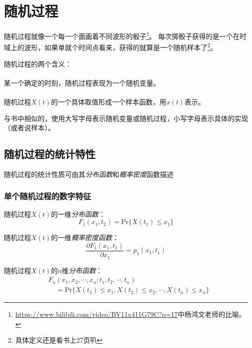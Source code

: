 \section{随机过程}\label{chapter:III}
    随机过程就像一个每一个面画着不同波形的骰子\footnote{\url{https://www.bilibili.com/video/BV11x411G79C?p=17}中杨鸿文老师的比喻。}。
    每次掷骰子获得的是一个在时域上的波形，如果单就个时间点看来，获得的就算是一个随机样本了\footnote{具体定义还是看书上27页叭}。

    随机过程的两个含义：
    \vspace{-2ex}
    \paragraph{}某一个确定的时刻，随机过程表现为一个随机变量。
    \vspace{-2ex}
    \paragraph{}随机过程$X(t)$的一个具体取值形成一个样本函数，用$x(t)$表示。
    \vspace{1ex}

    与书中相似的，使用大写字母表示随机变量或随机过程，小写字母表示具体的实现（或者说样本）。

\subsection{随机过程的统计特性}
    随机过程的统计性质可由其\emph{分布函数}和\emph{概率密度}函数描述

    \subsubsection{单个随机过程的数字特征}

    随机过程$X(t)$的一维\emph{分布函数}：
    \begin{equation}
        F_1(x_1,t_2)=\text{Pr}\{X(t_1)\leq x_1\}
    \end{equation}

    随机过程$X(t)$的一维\emph{概率密度函数}：
    \begin{equation}
        \frac{\partial F_1(x_1,t_1)}{\partial x_1}=p_1(x_1,t_1)
    \end{equation}

    随机过程$X(t)$的$n$维\emph{分布函数}：
    \begin{equation}
        \begin{split}
            &F_n(x_1,x_2,\cdots,x_n;t_1,t_2,\cdots,t_n)\\
            &\phantom{F_n}=\text{Pr}\{X(t_1)\leq x_1,X(t_2)\leq x_2,\cdots ,X(t_n)\leq x_n\}
        \end{split}
    \end{equation}


